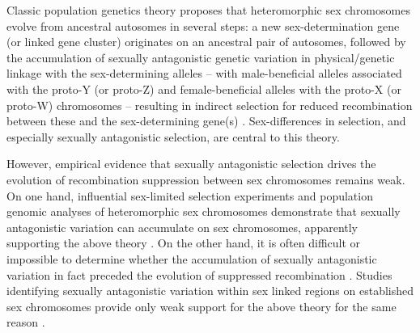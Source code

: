 \documentclass{article}[12pt]
\begin{document}
Classic population genetics theory proposes that heteromorphic sex chromosomes evolve from ancestral autosomes in several steps: a new sex-determination gene (or linked gene cluster) originates on an ancestral pair of autosomes, followed by the accumulation of sexually antagonistic genetic variation in physical/genetic linkage with the sex-determining alleles -- with male-beneficial alleles associated with the proto-Y (or proto-Z) and female-beneficial alleles with the proto-X (or proto-W) chromosomes -- resulting in indirect selection for reduced recombination between these and the sex-determining gene(s) \citep{Fisher1931, Nei1969, Charlesworth1980, Bull1983, Rice1987, Lenormand2003, CharlesworthMarais2005}. Sex-differences in selection, and especially sexually antagonistic selection, are central to this theory. %

However, empirical evidence that sexually antagonistic selection drives the evolution of recombination suppression between sex chromosomes remains weak. On one hand, influential sex-limited selection experiments and population genomic analyses of heteromorphic sex chromosomes demonstrate that sexually antagonistic variation can accumulate on sex chromosomes, apparently supporting the above theory \cite[e.g.,][]{Rice1992,Chippindale2001,Gibson2002, ZhouBachtrog2012,QiuBergeroCharlesworth2013}. On the other hand, it is often difficult or impossible to determine whether the accumulation of sexually antagonistic variation in fact preceded the evolution of suppressed recombination \citep{Charlesworth1980, Rice1984, Ironside2010, Ponnikas2018}. Studies identifying sexually antagonistic variation within sex linked regions on established sex chromosomes provide only weak support for the above theory for the same reason \cite[e.g.][]{BergeroCharlesworth2009,QiuBergeroCharlesworth2013,KirkpatrickGuerrero2014, Wright2017, BergeroCharlesworth2019}.
\end{document}

